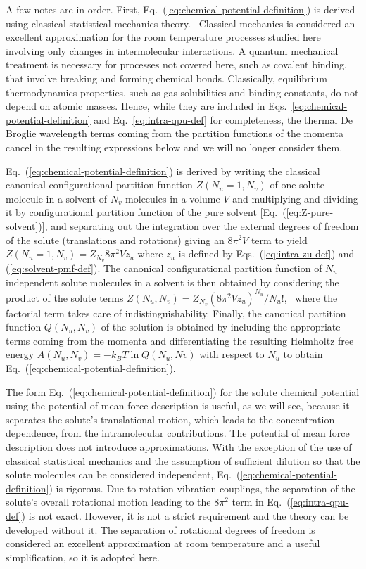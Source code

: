 \documentclass[9pt,bestpractices,pubversion]{livecoms}
\begin{document}
A few notes are in order. First, Eq.~(\ref{eq:chemical-potential-definition}) is derived using classical statistical mechanics theory.~\cite{hill1986statthermo} Classical mechanics is considered an excellent approximation for the room temperature processes studied here involving only changes in intermolecular interactions. A quantum mechanical treatment is necessary for processes not covered here, such as covalent binding, that involve breaking and forming chemical bonds. Classically, equilibrium thermodynamics properties, such as gas solubilities and binding constants, do not depend on atomic masses. Hence, while they are included in Eqs.~\ref{eq:chemical-potential-definition} and Eq.~\ref{eq:intra-qpu-def} for completeness, the thermal De Broglie wavelength terms coming from the partition functions of the momenta cancel in the resulting expressions below and we will no longer consider them.

Eq.~(\ref{eq:chemical-potential-definition}) is derived by writing the classical canonical configurational partition function $Z(N_u = 1, N_v)$ of one solute molecule in a solvent of $N_v$ molecules in a volume $V$ and multiplying and dividing it by configurational partition function of the pure solvent [Eq.~(\ref{eq:Z-pure-solvent})], and separating out the integration over the external degrees of freedom of the solute (translations and rotations) giving an $8 \pi^2 V$ term to yield $Z(N_u = 1, N_v) = Z_{N_v} 8 \pi^2 V z_u$ where $z_u$ is defined by Eqs.~(\ref{eq:intra-zu-def}) and (\ref{eq:solvent-pmf-def}). The canonical configurational partition function of $N_u$ independent solute molecules in a solvent is then obtained by considering the product of the solute terms $Z(N_u, N_v) = Z_{N_v} (8 \pi^2 V z_u)^{N_u}/N_u!$,~\cite{guggenheim1952mixtures504,simonson2016physical} where the factorial term takes care of indistinguishability. Finally, the canonical partition function $Q(N_u, N_v)$ of the solution is obtained by including the appropriate terms coming from the momenta and differentiating the resulting Helmholtz free energy $A(N_u, N_v) = -k_B T \ln Q(N_u, Nv)$ with respect to $N_u$ to obtain Eq.~(\ref{eq:chemical-potential-definition}).

The form Eq.~(\ref{eq:chemical-potential-definition}) for the solute chemical potential using the potential of mean force description is useful, as we will see, because it separates the solute's translational motion, which leads to the concentration dependence, from the intramolecular contributions. The potential of mean force description does not introduce approximations. With the exception of the use of classical statistical mechanics and the assumption of sufficient dilution so that the solute molecules can be considered independent, Eq.~(\ref{eq:chemical-potential-definition}) is rigorous. Due to rotation-vibration couplings, the separation of the solute's overall rotational motion leading to the $8 \pi^2$ term in Eq.~(\ref{eq:intra-qpu-def}) is not exact. However, it is not a strict requirement and the theory can be developed without it. The separation of rotational degrees of freedom is considered an excellent approximation at room temperature and a useful simplification, so it is adopted here.
\end{document}
